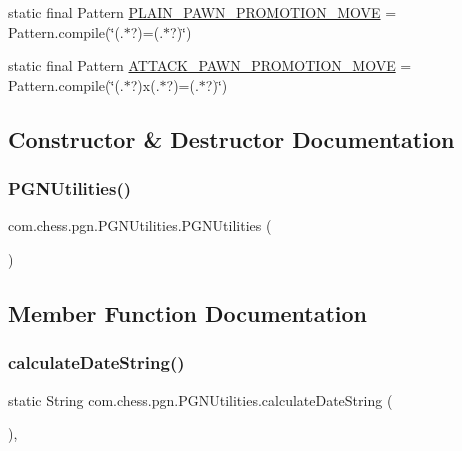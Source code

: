 \begin{DoxyCompactItemize}
\item 
static final Pattern \mbox{\hyperlink{classcom_1_1chess_1_1pgn_1_1_p_g_n_utilities_a56ec3a93f077efe83456b24779573fc7}{P\+L\+A\+I\+N\+\_\+\+P\+A\+W\+N\+\_\+\+P\+R\+O\+M\+O\+T\+I\+O\+N\+\_\+\+M\+O\+VE}} = Pattern.\+compile(\char`\"{}(.$\ast$?)=(.$\ast$?)\char`\"{})
\item 
static final Pattern \mbox{\hyperlink{classcom_1_1chess_1_1pgn_1_1_p_g_n_utilities_a6ed575160c72a1eb57ae9df424afa961}{A\+T\+T\+A\+C\+K\+\_\+\+P\+A\+W\+N\+\_\+\+P\+R\+O\+M\+O\+T\+I\+O\+N\+\_\+\+M\+O\+VE}} = Pattern.\+compile(\char`\"{}(.$\ast$?)x(.$\ast$?)=(.$\ast$?)\char`\"{})
\end{DoxyCompactItemize}


\subsection{Constructor \& Destructor Documentation}
\mbox{\label{classcom_1_1chess_1_1pgn_1_1_p_g_n_utilities_a958310bdf2db804967035407d21b6fe3}} 
\subsubsection{\texorpdfstring{PGNUtilities()}{PGNUtilities()}}
{\footnotesize\ttfamily com.\+chess.\+pgn.\+P\+G\+N\+Utilities.\+P\+G\+N\+Utilities (\begin{DoxyParamCaption}{ }\end{DoxyParamCaption})\hspace{0.3cm}{\ttfamily [private]}}



\subsection{Member Function Documentation}
\mbox{\label{classcom_1_1chess_1_1pgn_1_1_p_g_n_utilities_af7992c0af1afb2451cb5b0cb5d44fe14}} 
\subsubsection{\texorpdfstring{calculateDateString()}{calculateDateString()}}
{\footnotesize\ttfamily static String com.\+chess.\+pgn.\+P\+G\+N\+Utilities.\+calculate\+Date\+String (\begin{DoxyParamCaption}{ }\end{DoxyParamCaption})\hspace{0.3cm}{\ttfamily [static]}, {\ttfamily [private]}}

